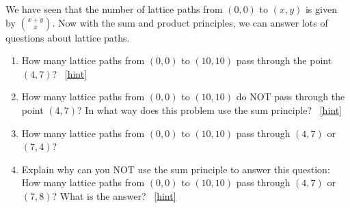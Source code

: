 \documentclass{book}
\begin{document}
\setcounter{project}{85}
\addtocounter{project}{-1}
\begin{activity}[]\label{act-latticepaths2}
\hypertarget{p-664}{}%
We have seen that the number of lattice paths from \((0,0)\) to \((x,y)\) is given by \(\binom{x+y}{x}\).  Now with the sum and product principles, we can answer lots of questions about lattice paths.%
\begin{enumerate}[font=\bfseries,label=(\alph*),ref=\alph*]
\item\label{task-130} \hypertarget{p-665}{}%
How many lattice paths from \((0,0)\) to \((10,10)\) pass through the point \((4,7)\)?%
~\hfill{\tiny\hyperlink{a-85.a}{[hint]}\hypertarget{q-85.a}{}}\item\label{task-131} \hypertarget{p-667}{}%
How many lattice paths from \((0,0)\) to \((10,10)\) do NOT pass through the point \((4,7)\)?  In what way does this problem use the sum principle?%
~\hfill{\tiny\hyperlink{a-85.b}{[hint]}\hypertarget{q-85.b}{}}\item\label{task-132} \hypertarget{p-669}{}%
How many lattice paths from \((0,0)\) to \((10,10)\) pass through \((4,7)\) or \((7,4)\)?%
\item\label{task-133} \hypertarget{p-670}{}%
Explain why can you NOT use the sum principle to answer this question: How many lattice paths from \((0,0)\) to \((10,10)\) pass through \((4,7)\) or \((7,8)\)?  What is the answer?%
~\hfill{\tiny\hyperlink{a-85.d}{[hint]}\hypertarget{q-85.d}{}}\end{enumerate}
\end{activity}
\end{document}
